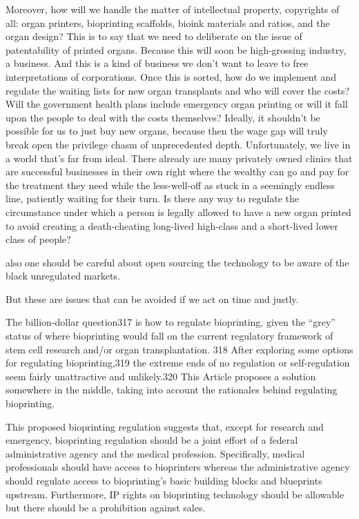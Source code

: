 \documentclass[12pt]{article} %
\begin{document}
Moreover, how will we handle the matter of intellectual property, copyrights of all: organ printers, bioprinting scaffolds, bioink materials and ratios, and the organ design? This is to say that we need to deliberate on the issue\footnotemark{} of patentability of printed organs. Because this will soon be high-grossing industry, a business. And this is a kind of business we don't want to leave to free interpretations of corporations. 
Once this is sorted, how do we implement and regulate the waiting lists for new organ transplants and who will cover the costs? Will the government health plans include emergency organ printing or will it fall upon the people to deal with the costs themselves? 
Ideally, it shouldn't be possible for us to just buy new organs, because then the wage gap will truly break open the privilege chasm of unprecedented depth. Unfortunately, we live in a world that's far from ideal. There already are many privately owned clinics that are successful businesses in their own right where the wealthy can go and pay for the treatment they need while the less-well-off as stuck in a seemingly endless line, patiently waiting for their turn.
Is there any way to regulate the circumstance under which a person is legally allowed to have a new organ printed to avoid creating a death-cheating long-lived high-class and a short-lived lower class of people?
 


also one should be careful about open sourcing the technology to be aware of the black unregulated markets.

But these are issues that can be avoided if we act on time and justly. 


The billion-dollar question317 is how to regulate bioprinting,
given the “grey” status of where bioprinting would fall on the
current regulatory framework of stem cell research and/or organ
transplantation. 318 After exploring some options for regulating
bioprinting,319 the extreme ends of no regulation or self-regulation
seem fairly unattractive and unlikely.320 This Article proposes a
solution somewhere in the middle, taking into account the
rationales behind regulating bioprinting.


This proposed bioprinting regulation suggests that, except for
research and emergency, bioprinting regulation should be a joint
effort of a federal administrative agency and the medical
profession. Specifically, medical professionals should have access
to bioprinters whereas the administrative agency should regulate
access to bioprinting’s basic building blocks and blueprints
upstream. Furthermore, IP rights on bioprinting technology should
be allowable but there should be a prohibition against sales.
\end{document}
